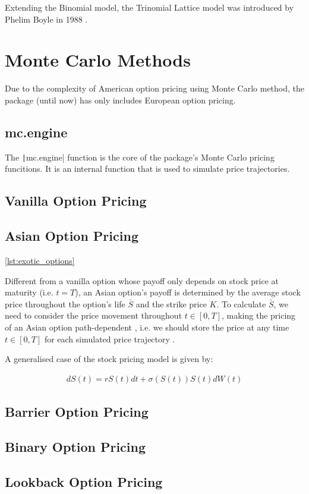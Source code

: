 Extending the Binomial model, the Trinomial Lattice model was introduced by Phelim Boyle in 1988 \cite{Boyle1988}.


\newpage

\section{Monte Carlo Methods}

Due to the complexity of American option pricing using Monte Carlo method, the package (until now) has only includes European option pricing.

\subsection{mc.engine}

The \texttt|mc.engine| function is the core of the package's Monte Carlo pricing funcitions. It is an internal function that is used to simulate price trajectories.

\subsection{Vanilla Option Pricing}



\subsection{Asian Option Pricing}

\ref{lst:exotic_options}

Different from a vanilla option whose payoff only depends on stock price at maturity (i.e. $t = T$), an Asian option's payoff is determined by the average stock price throughout the option's life $\bar{S}$ and the strike price $K$. To calculate $\bar{S}$, we need to consider the price movement throughout $t \in [0, T]$, making the pricing of an Asian option path-dependent , i.e. we should store the price at any time $t \in [0,T]$ for each simulated price trajectory \cite{Higham2004}.

A generalised case of the stock pricing model is given by:

\begin{align}
    dS(t) = rS(t)dt + \sigma(S(t))S(t)dW(t)
\end{align}

\subsection{Barrier Option Pricing}

\subsection{Binary Option Pricing}

\subsection{Lookback Option Pricing}

